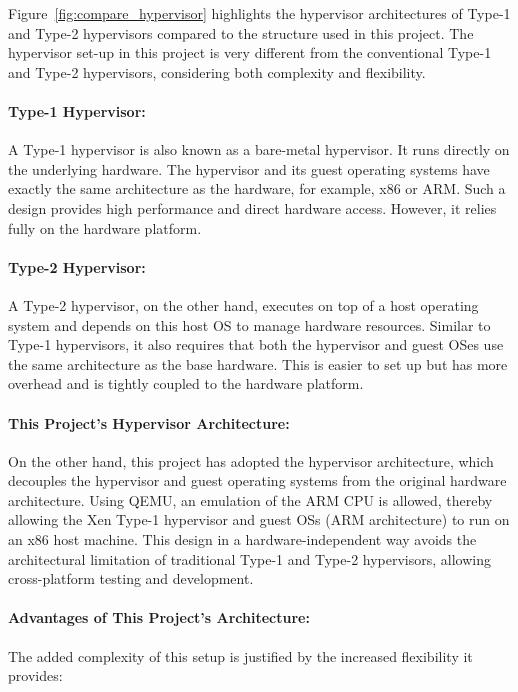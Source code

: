 \documentclass[acmtog]{acmart}
\begin{document}
Figure~\ref{fig:compare_hypervisor} highlights the hypervisor architectures of Type-1 and Type-2 hypervisors compared to the structure used in this project. The hypervisor set-up in this project is very different from the conventional Type-1 and Type-2 hypervisors, considering both complexity and flexibility.

\paragraph{Type-1 Hypervisor:}
A Type-1 hypervisor is also known as a bare-metal hypervisor. It runs directly on the underlying hardware. The hypervisor and its guest operating systems have exactly the same architecture as the hardware, for example, x86 or ARM. Such a design provides high performance and direct hardware access. However, it relies fully on the hardware platform.

\paragraph{Type-2 Hypervisor:}
A Type-2 hypervisor, on the other hand, executes on top of a host operating system and depends on this host OS to manage hardware resources. Similar to Type-1 hypervisors, it also requires that both the hypervisor and guest OSes use the same architecture as the base hardware. This is easier to set up but has more overhead and is tightly coupled to the hardware platform.


\paragraph{This Project's Hypervisor Architecture:}
On the other hand, this project has adopted the hypervisor architecture, which decouples the hypervisor and guest operating systems from the original hardware architecture. Using QEMU, an emulation of the ARM CPU is allowed, thereby allowing the Xen Type-1 hypervisor and guest OSs (ARM architecture) to run on an x86 host machine. This design in a hardware-independent way avoids the architectural limitation of traditional Type-1 and Type-2 hypervisors, allowing cross-platform testing and development.


\paragraph{Advantages of This Project's Architecture:}
The added complexity of this setup is justified by the increased flexibility it provides:
\end{document}
